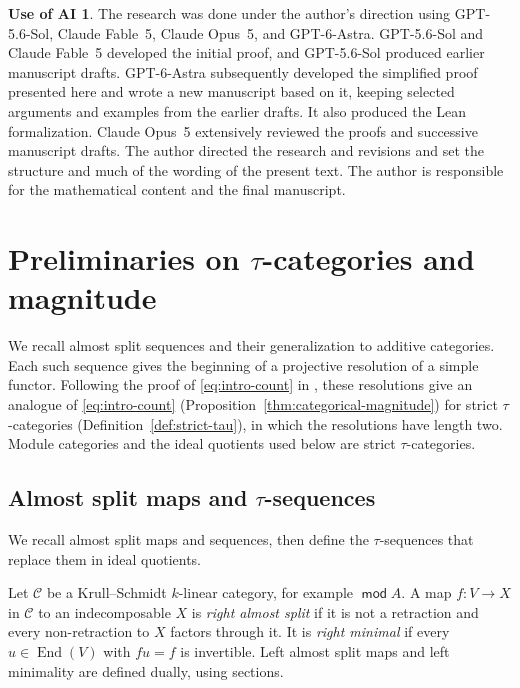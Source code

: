 \documentclass[a4paper,reqno,10pt]{amsart}
\theoremstyle{definition}
\newtheorem*{aiuse}{Use of AI}
\numberwithin{equation}{section}
\DeclareMathOperator{\moduleCategory}{\mathsf{mod}}
\renewcommand{\mod}{\moduleCategory}
\DeclareMathOperator{\End}{End}
\newcommand{\cC}{\mathcal C}
\begin{document}
\begin{aiuse}
The research was done under the author's direction using GPT-5.6-Sol,
Claude Fable~5, Claude Opus~5, and GPT-6-Astra. GPT-5.6-Sol and Claude Fable~5 developed
the initial proof, and GPT-5.6-Sol produced earlier manuscript drafts.
GPT-6-Astra subsequently developed the simplified proof presented here and
wrote a new manuscript based on it, keeping selected arguments and examples
from the earlier drafts. It also produced the Lean formalization.
Claude Opus~5 extensively reviewed the proofs and
successive manuscript drafts. The author directed the research and revisions and
set the structure and much of the wording of the present text. The author
is responsible for the mathematical content and the final manuscript.
\end{aiuse}

\section{Preliminaries on \texorpdfstring{\(\tau\)}{tau}-categories and magnitude}\label{sec:ar}
We recall almost split sequences and their generalization to additive
categories. Each such sequence gives the beginning of a projective
resolution of a simple functor. Following the proof of
\eqref{eq:intro-count} in \cite[Lemma~1.9]{BHK}, these resolutions give an
analogue of \eqref{eq:intro-count} (Proposition~\ref{thm:categorical-magnitude})
for strict \(\tau\)-categories (Definition~\ref{def:strict-tau}), in which
the resolutions have length two. Module categories and the ideal quotients
used below are strict \(\tau\)-categories.

\subsection{Almost split maps and \texorpdfstring{\(\tau\)}{tau}-sequences}\label{subsec:tau-seq}
We recall almost split maps and sequences, then define the
\(\tau\)-sequences that replace them in ideal quotients.

Let \(\cC\) be a Krull--Schmidt \(k\)-linear category, for example
\(\mod A\). A map \(f:V\to X\) in \(\cC\) to an indecomposable \(X\) is
\emph{right almost split}
if it is not a retraction and every non-retraction to \(X\) factors through it.
It is \emph{right minimal} if every \(u\in\End(V)\) with \(fu=f\)
is invertible. Left almost split maps and left minimality are defined dually,
using sections.
\end{document}
